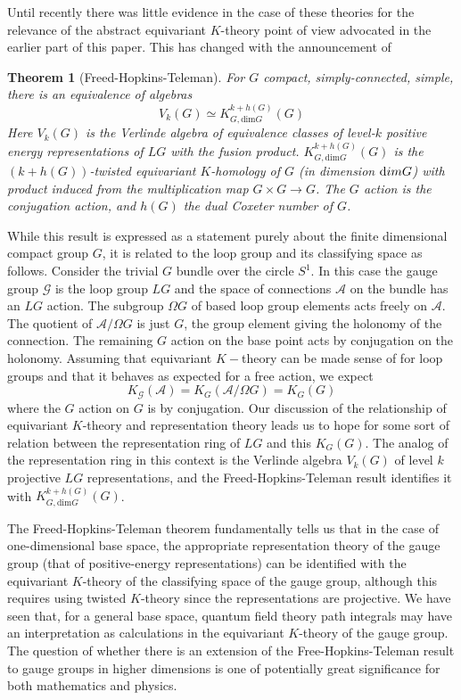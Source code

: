 \documentclass[a4paper,a4paper]{article}
\newtheorem{theorem}{Theorem}
\theoremstyle{conjecture}
\begin{document}
Until recently there was little evidence in the case of these theories for the relevance of the abstract
equivariant $K$-theory point of view advocated in the earlier part of this paper.  This has changed with
the announcement \cite{Freed2} of

\begin{theorem}[Freed-Hopkins-Teleman]

For $G$ compact, simply-connected, simple, there is an equivalence of algebras
$$V_k(G)\simeq K_{G,\text {dim} G}^{k+h(G)}(G)$$
Here $V_k(G)$ is the Verlinde algebra of equivalence classes of level-$k$ positive energy representations of
$LG$ with the fusion product.  $K_{G,\text {dim} G}^{k+h(G)}(G)$ is the
$(k+h(G))$-twisted equivariant $K$-homology of $G$ (in dimension ${\text dim} G$)  with product induced from the
multiplication map $G\times G\rightarrow G$.
The $G$ action is the conjugation action, and $h(G)$ the dual Coxeter number of $G$.

\end{theorem}

While this result is expressed as a statement purely about the finite dimensional compact group $G$, it is related
to the loop group and its classifying space as follows.  Consider the trivial $G$ bundle over the circle $S^1$. In this
case the gauge group $\mathcal G$
is the loop group $LG$ and the space of connections $\mathcal A$ on the bundle has an $LG$ action.
The subgroup $\Omega G$ of based loop group elements acts freely on $\mathcal A$.  The quotient of $\mathcal A/\Omega G$ is
just $G$, the group element giving the holonomy of the connection.  The remaining $G$ action on the base point acts by
conjugation on the holonomy.  Assuming that equivariant $K-$theory can be made sense of for loop groups and that it
behaves as expected for a free action, we expect
$$K_{\mathcal G}(\mathcal A)=K_G(\mathcal A/\Omega G)=K_G(G)$$
where the $G$ action on $G$ is by conjugation.  Our discussion of
the relationship of equivariant $K$-theory and representation
theory leads us to hope for some sort of relation between the
representation ring of $LG$ and this $K_G(G)$.  The analog of the
representation ring in this context is the Verlinde algebra
$V_k(G)$ of level $k$ projective $LG$ representations, and the
Freed-Hopkins-Teleman result identifies it with $K_{G,\text {dim}
G}^{k+h(G)}(G)$.

The Freed-Hopkins-Teleman theorem fundamentally tells us that in the case of one-dimensional base space, 
the appropriate representation theory of the gauge group (that of positive-energy representations) can
be identified with the equivariant $K$-theory of the classifying space of the gauge group, although this 
requires using twisted $K$-theory since the representations are projective.  We have seen that, for a
general base space,
quantum field theory path integrals may have an interpretation as calculations in the equivariant
$K$-theory of the gauge group.  The question of whether there is an extension of the 
Free-Hopkins-Teleman result to gauge groups in higher dimensions is one of potentially great
significance for both mathematics and physics. 
\end{document}
